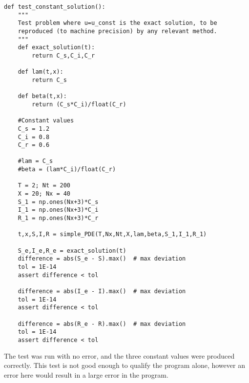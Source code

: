 \documentclass[%
twoside,                 %
final,                   %
chapterprefix=true,      %
open=right               %
10pt]{book}
\begin{document}
\begin{Verbatim}[numbers=none,fontsize=\fontsize{9pt}{9pt},baselinestretch=0.95]
def test_constant_solution():
    """
    Test problem where u=u_const is the exact solution, to be
    reproduced (to machine precision) by any relevant method.
    """
    def exact_solution(t):
        return C_s,C_i,C_r
    
    def lam(t,x):
        return C_s

    def beta(t,x):
        return (C_s*C_i)/float(C_r)

    #Constant values
    C_s = 1.2
    C_i = 0.8
    C_r = 0.6
    
    #lam = C_s
    #beta = (lam*C_i)/float(C_r)
    
    T = 2; Nt = 200
    X = 20; Nx = 40
    S_1 = np.ones(Nx+3)*C_s
    I_1 = np.ones(Nx+3)*C_i
    R_1 = np.ones(Nx+3)*C_r
    
    t,x,S,I,R = simple_PDE(T,Nx,Nt,X,lam,beta,S_1,I_1,R_1)
    
    S_e,I_e,R_e = exact_solution(t)
    difference = abs(S_e - S).max()  # max deviation
    tol = 1E-14
    assert difference < tol

    difference = abs(I_e - I).max()  # max deviation
    tol = 1E-14
    assert difference < tol

    difference = abs(R_e - R).max()  # max deviation
    tol = 1E-14
    assert difference < tol
\end{Verbatim}

The test was run with no error, and the three constant values were produced correctly. This test is not good enough to qualify the program alone, however an error here would result in a large error in the program. 
\end{document}
